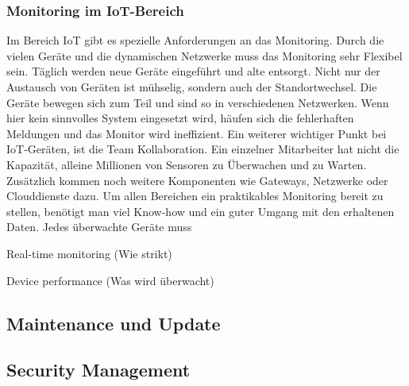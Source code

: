 \subsubsection{Monitoring im IoT-Bereich}
Im Bereich IoT gibt es spezielle Anforderungen an das Monitoring. Durch die vielen Geräte und die dynamischen Netzwerke muss das Monitoring sehr Flexibel sein. Täglich werden neue Geräte eingeführt und alte entsorgt. Nicht nur der Austausch von Geräten ist mühselig, sondern auch der Standortwechsel. Die Geräte bewegen sich zum Teil und sind so in verschiedenen Netzwerken. Wenn hier kein sinnvolles System eingesetzt wird, häufen sich die fehlerhaften Meldungen und das Monitor wird ineffizient. \newline
Ein weiterer wichtiger Punkt bei IoT-Geräten, ist die Team Kollaboration. Ein einzelner Mitarbeiter hat nicht die Kapazität, alleine Millionen von Sensoren zu Überwachen und zu Warten. Zusätzlich kommen noch weitere Komponenten wie Gateways, Netzwerke oder Clouddienste dazu. Um allen Bereichen ein praktikables Monitoring bereit zu stellen, benötigt man viel Know-how und ein guter Umgang mit den erhaltenen Daten. \newline
Jedes überwachte Geräte muss 


Real-time monitoring (Wie strikt)

Device performance (Was wird überwacht)



\subsection{Maintenance und Update}
\subsection{Security Management}

\section{}

















